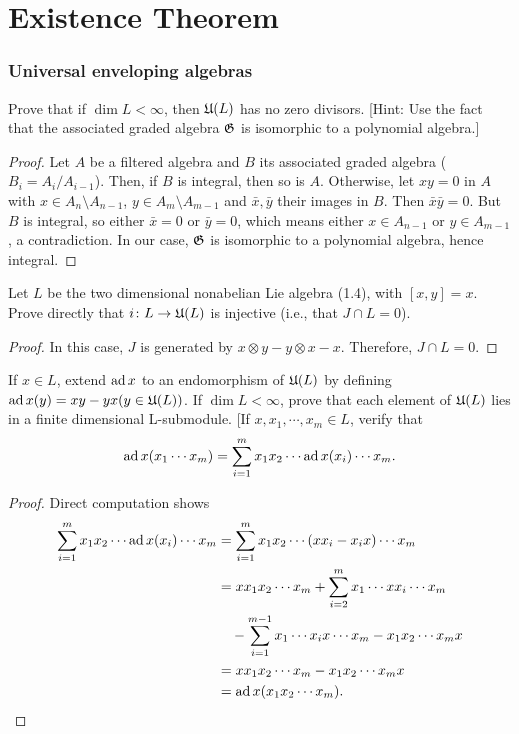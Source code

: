 \part{Existence Theorem}
\section{Universal enveloping algebras}

\begin{ex}
  Prove that if $\dim L < \infty$, then $\mathfrak{U}(L)$ has no zero divisors. [Hint: Use the fact that the associated graded algebra $\mathfrak{G}$ is isomorphic to a polynomial algebra.]
\end{ex}
\begin{proof}
	Let $A$ be a filtered algebra and $B$ its associated graded algebra ($B_i=A_i/A_{i-1}$). Then, if $B$ is integral, then so is $A$. Otherwise, let $xy = 0$ in $A$ with $x\in A_n\setminus A_{n-1}$, $y\in A_m\setminus A_{m-1}$ and $\bar{x},\bar{y}$ their images in $B$. Then $\bar{x}\bar{y}=0$. But $B$ is integral, so either $\bar{x}=0$ or $\bar{y}=0$, which means either $x\in A_{n-1}$ or $y\in A_{m-1}$, a contradiction. In our case, $\mathfrak{G}$ is isomorphic to a polynomial algebra, hence integral.
\end{proof}

\begin{ex}
	Let $L$ be the two dimensional nonabelian Lie algebra (1.4), with $[x,y] = x$. Prove directly that $i\colon L\to \mathfrak{U}(L)$ is injective (i.e., that $J\cap L = 0$).
\end{ex}
\begin{proof}
	In this case, $J$ is generated by $x\otimes y - y\otimes x - x$. Therefore, $J\cap L = 0$.
\end{proof}

\begin{ex}
	If $x\in L$, extend $\operatorname{ad} x$ to an endomorphism of $\mathfrak{U}(L)$ by defining $\operatorname{ad} x(y) = xy-yx (y\in \mathfrak{U}(L))$. If $\dim L < \infty$, prove that each element of $\mathfrak{U}(L)$ lies in a finite dimensional L-submodule. [If $x,x_1,\cdots,x_m\in L$, verify that 
	\[\operatorname{ad} x(x_1\cdots x_m) = \sum_{i=1}^m x_1x_2\cdots\operatorname{ad} x(x_i)\cdots x_m.\]
\end{ex}
\begin{proof}
	Direct computation shows
	\begin{align*}
		\sum_{i=1}^m x_1x_2\cdots\operatorname{ad} x(x_i)\cdots x_m &
		= \sum_{i=1}^m x_1x_2\cdots(xx_i-x_ix)\cdots x_m \\
		&= xx_1x_2\cdots x_m + \sum_{i=2}^m x_1\cdots xx_i\cdots x_m \\
		&\quad - \sum_{i=1}^{m-1} x_1\cdots x_ix\cdots x_m - x_1x_2\cdots x_mx \\
		&= xx_1x_2\cdots x_m - x_1x_2\cdots x_mx \\
		&= \operatorname{ad} x(x_1x_2\cdots x_m).
	\end{align*}
\end{proof}

